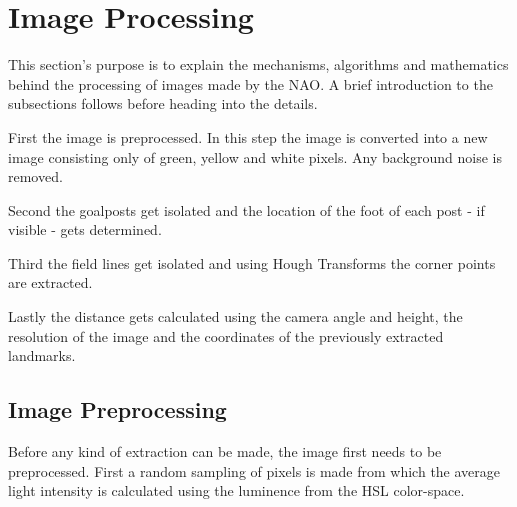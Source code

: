 \documentclass{ba-kecs}
\numberwithin{figure}{section}
\numberwithin{equation}{section}
\begin{document}

\section{Image Processing}

This section's purpose is to explain the mechanisms, algorithms and mathematics behind the processing of images made by the NAO.
A brief introduction to the subsections follows before heading into the details.

First the image is preprocessed. In this step the image is converted into a new image consisting only of green, yellow and white pixels. Any background noise is removed.

Second the goalposts get isolated and the location of the foot of each post - if visible - gets determined.

Third the field lines get isolated and using Hough Transforms the corner points are extracted.

Lastly the distance gets calculated using the camera angle and height, the resolution of the image and the coordinates of the previously extracted landmarks.

\subsection{Image Preprocessing}
Before any kind of extraction can be made, the image first needs to be preprocessed. First a random sampling of pixels is made from which the average light intensity is calculated using the luminence from the HSL color-space.
\end{document}
